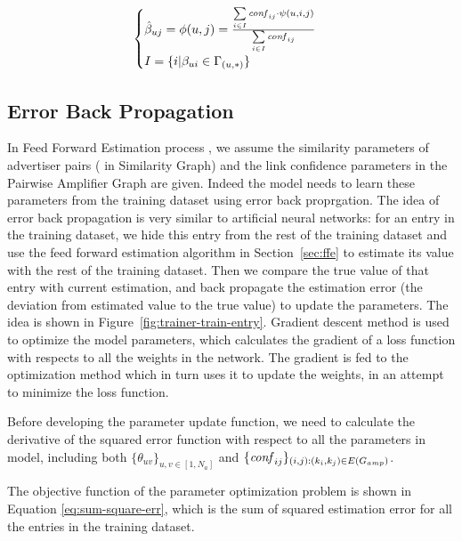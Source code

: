 \begin{equation}
  \label{eq:feedforward_1}
  \begin{cases}    \hat{\beta}_{uj}=\phi(u,j)=\frac{\sum\limits_{i\in I} \confi{ij}\cdot \psi(u,i,j)}{\sum\limits_{i\in I} \confi{ij}} \\
  	    I=\{i|\beta_{ui}\in\Gamma_{(u,*)}\}
  \end{cases}
\end{equation}

\subsection{Error Back Propagation}
\label{sec:bp}

In Feed Forward Estimation process , we assume the similarity
parameters of advertiser pairs ( in Similarity Graph) and the link
confidence parameters in the Pairwise Amplifier Graph are
given. Indeed the model needs to learn these parameters from the
training dataset using error back proprgation.  The idea of error back
propagation is very similar to artificial neural networks: for an
entry in the training dataset, we hide this entry from the rest of the
training dataset and use the feed forward estimation algorithm in
Section~\ref{sec:ffe} to estimate its value with the rest of the
training dataset. Then we compare the true value of that entry with
current estimation, and back propagate the estimation error (the
deviation from estimated value to the true value) to update the
parameters.  The idea is shown in
Figure~\ref{fig:trainer-train-entry}.  Gradient descent method
\cite{?} is used to optimize the model parameters, which calculates
the gradient of a loss function with respects to all the weights in
the network. The gradient is fed to the optimization method which in
turn uses it to update the weights, in an attempt to minimize the loss
function.

Before developing the parameter update function, we need to calculate
the derivative of the squared error function with respect to all the
parameters in {\sppan} model, including both
$\{\theta_{uv}\}_{u,v\in[1,N_a]}$ and
$\{\mathit{conf}_{ij}\}_{(i,j):(k_i,k_j)\in E(G_{amp})}$.

The objective function of the parameter optimization problem is shown
in Equation \ref{eq:sum-square-err}, which is the sum of squared
estimation error for all the entries in the training dataset.

